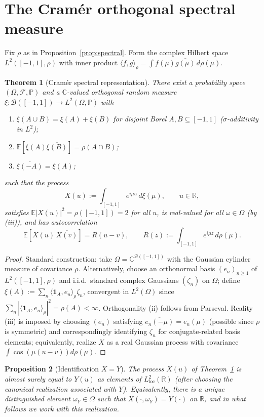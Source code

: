 \documentclass[11pt]{article}
\newtheorem{theorem}{Theorem}
\newtheorem{proposition}[theorem]{Proposition}
\theoremstyle{definition}
\theoremstyle{remark}
\newcommand{\R}{\mathbb{R}}
\newcommand{\C}{\mathbb{C}}
\newcommand{\E}{\mathbb{E}}
\begin{document}
\section{The Cram\'er orthogonal spectral measure}

Fix $\rho$ as in Proposition~\ref{prop:spectral}. Form the complex Hilbert space $L^2([-1,1], \rho)$ with inner product $\langle f, g\rangle_\rho = \int f(\mu)\overline{g(\mu)}\,d\rho(\mu)$.

\begin{theorem}[Cram\'er spectral representation]\label{thm:cramer}
There exist a probability space $(\Omega, \mathcal F, \mathbb P)$ and a $\C$-valued orthogonal random measure $\xi: \mathcal B([-1,1]) \to L^2(\Omega, \mathbb P)$ with
\begin{enumerate}
\item[(i)] $\xi(A \cup B) = \xi(A) + \xi(B)$ for disjoint Borel $A, B \subseteq [-1,1]$ ($\sigma$-additivity in $L^2$);
\item[(ii)] $\E[\xi(A)\overline{\xi(B)}] = \rho(A\cap B)$;
\item[(iii)] $\overline{\xi(-A)} = \xi(A)$;
\end{enumerate}
such that the process
\[
X(u) := \int_{[-1,1]} e^{i\mu u}\, d\xi(\mu), \qquad u \in \R,
\]
satisfies $\E|X(u)|^2 = \rho([-1,1]) = 2$ for all $u$, is real-valued for all $\omega \in \Omega$ (by (iii)), and has autocorrelation
\[
\E[X(u)\,\overline{X(v)}] = R(u - v),\qquad R(z) := \int_{[-1,1]} e^{i\mu z}\, d\rho(\mu).
\]
\end{theorem}

\begin{proof}
Standard construction: take $\Omega = \C^{\mathcal B([-1,1])}$ with the Gaussian cylinder measure of covariance $\rho$. Alternatively, choose an orthonormal basis $(e_n)_{n\geq 1}$ of $L^2([-1,1],\rho)$ and i.i.d.\ standard complex Gaussians $(\zeta_n)$ on $\Omega$; define $\xi(A) := \sum_n \langle \mathbf 1_A, e_n\rangle_\rho \zeta_n$, convergent in $L^2(\Omega)$ since $\sum_n |\langle\mathbf 1_A, e_n\rangle_\rho|^2 = \rho(A) < \infty$. Orthogonality (ii) follows from Parseval. Reality (iii) is imposed by choosing $(e_n)$ satisfying $\overline{e_n(-\mu)} = e_n(\mu)$ (possible since $\rho$ is symmetric) and correspondingly identifying $\zeta_n$ for conjugate-related basis elements; equivalently, realize $X$ as a real Gaussian process with covariance $\int\cos(\mu(u-v))d\rho(\mu)$.
\end{proof}

\begin{proposition}[Identification $X = Y$]\label{prop:XisY}
The process $X(u)$ of Theorem~\ref{thm:cramer} is almost surely equal to $Y(u)$ as elements of $L^2_{\mathrm{loc}}(\R)$ (after choosing the canonical realization associated with $Y$). Equivalently, there is a unique distinguished element $\omega_Y \in \Omega$ such that $X(\cdot, \omega_Y) = Y(\cdot)$ on $\R$, and in what follows we work with this realization.
\end{proposition}
\end{document}
